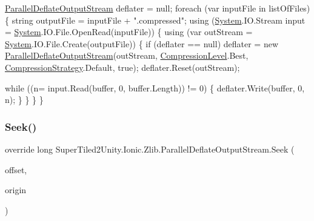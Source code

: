 \begin{DoxyCode}
\mbox{\hyperlink{class_super_tiled2_unity_1_1_ionic_1_1_zlib_1_1_parallel_deflate_output_stream_aba84c882116b0dbb99bdc1d939e50b0c}{ParallelDeflateOutputStream}} deflater = null;
\textcolor{keywordflow}{foreach} (var inputFile \textcolor{keywordflow}{in} listOfFiles)
\{
    \textcolor{keywordtype}{string} outputFile = inputFile + \textcolor{stringliteral}{".compressed"};
    \textcolor{keyword}{using} (\mbox{\hyperlink{namespace_system}{System}}.IO.Stream input = \mbox{\hyperlink{namespace_system}{System}}.IO.File.OpenRead(inputFile))
    \{
        \textcolor{keyword}{using} (var outStream = \mbox{\hyperlink{namespace_system}{System}}.IO.File.Create(outputFile))
        \{
            \textcolor{keywordflow}{if} (deflater == null)
                deflater = \textcolor{keyword}{new} \mbox{\hyperlink{class_super_tiled2_unity_1_1_ionic_1_1_zlib_1_1_parallel_deflate_output_stream_aba84c882116b0dbb99bdc1d939e50b0c}{ParallelDeflateOutputStream}}(outStream,
                                                           \mbox{\hyperlink{namespace_super_tiled2_unity_1_1_ionic_1_1_zlib_a20f6771804996c363f454ad9765cd7db}{CompressionLevel}}.Best,
                                                           \mbox{\hyperlink{namespace_super_tiled2_unity_1_1_ionic_1_1_zlib_abde5c10a1e2ee453e1e8e22e79a39a3b}{CompressionStrategy}}.Default,
                                                           \textcolor{keyword}{true});
            deflater.Reset(outStream);

            \textcolor{keywordflow}{while} ((n= input.Read(buffer, 0, buffer.Length)) != 0)
            \{
                deflater.Write(buffer, 0, n);
            \}
        \}
    \}
\}
\end{DoxyCode}
 \mbox{\label{class_super_tiled2_unity_1_1_ionic_1_1_zlib_1_1_parallel_deflate_output_stream_ac0d0af55d367d6a7059507964ed6911d}} 
\subsubsection{\texorpdfstring{Seek()}{Seek()}}
{\footnotesize\ttfamily override long Super\+Tiled2\+Unity.\+Ionic.\+Zlib.\+Parallel\+Deflate\+Output\+Stream.\+Seek (\begin{DoxyParamCaption}\item[{long}]{offset,  }\item[{System.\+I\+O.\+Seek\+Origin}]{origin }\end{DoxyParamCaption})}



